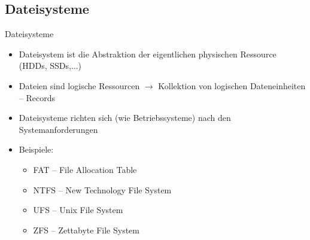 \documentclass[xcolor=dvipsnames,aspectratio=169]{beamer}
\begin{document}
\subsection{Dateisysteme}
\begin{frame}{Dateisysteme}
	\begin{itemize}
		\item Dateisystem ist die Abstraktion der eigentlichen physischen Ressource (HDDs, SSDs,...)
		\item Dateien sind logische Ressourcen $\rightarrow$ Kollektion von logischen Dateneinheiten -- Records
		\item Dateisysteme richten sich (wie Betriebssysteme) nach den Systemanforderungen
		\item Beispiele:
		\begin{itemize}
			\item FAT -- File Allocation Table
			\item NTFS -- New Technology File System
			\item UFS -- Unix File System
			\item ZFS -- Zettabyte File System
		\end{itemize}
	\end{itemize}
\end{frame}
\end{document}

